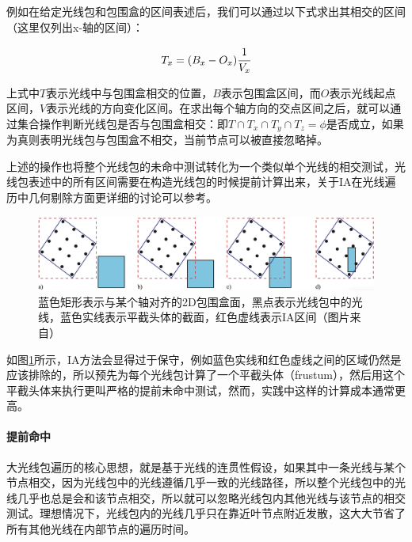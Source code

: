 例如在给定光线包和包围盒的区间表述后，我们可以通过以下式求出其相交的区间（这里仅列出x-轴的区间）：

\begin{equation}
	T_x=(B_x-O_x) \cfrac{1}{V_x}
\end{equation}

\noindent 上式中$T$表示光线中与包围盒相交的位置，$B$表示包围盒区间，而$O$表示光线起点区间，$V$表示光线的方向变化区间。在求出每个轴方向的交点区间之后，就可以通过集合操作判断光线包是否与包围盒相交：即$T\cap T_x \cap T_y \cap T_z=\phi$是否成立，如果为真则表明光线包与包围盒不相交，当前节点可以被直接忽略掉。

上述的操作也将整个光线包的未命中测试转化为一个类似单个光线的相交测试，光线包表述中的所有区间需要在构造光线包的时候提前计算出来，关于IA在光线遍历中几何剔除方面更详细的讨论可以参考\cite{a:GeometricandArithmeticCullingMethodsforEntireRayPackets}。

\begin{figure}
	\includegraphics[width=1.0\textwidth]{figures/pt/conservative-early-miss}
	\caption{蓝色矩形表示与某个轴对齐的2D包围盒面，黑点表示光线包中的光线，蓝色实线表示平截头体的截面，红色虚线表示IA区间（图片来自\cite{a:RayTracingDeformableScenesUsingDynamicBoundingVolumeHierarchies}）}
	\label{f:pt-conservative-early-miss}
\end{figure}

如图\ref{f:pt-conservative-early-miss}所示，IA方法会显得过于保守，例如蓝色实线和红色虚线之间的区域仍然是应该排除的，所以\cite{a:RayTracingDeformableScenesUsingDynamicBoundingVolumeHierarchies}预先为每个光线包计算了一个平截头体（frustum），然后用这个平截头体来执行更叫严格的提前未命中测试，然而，实践中这样的计算成本通常更高。









\paragraph{提前命中}
大光线包遍历的核心思想，就是基于光线的连贯性假设，如果其中一条光线与某个节点相交，因为光线包中的光线遵循几乎一致的光线路径，所以整个光线包中的光线几乎也总是会和该节点相交，所以就可以忽略光线包内其他光线与该节点的相交测试。理想情况下，光线包内的光线几乎只在靠近叶节点附近发散，这大大节省了所有其他光线在内部节点的遍历时间。

